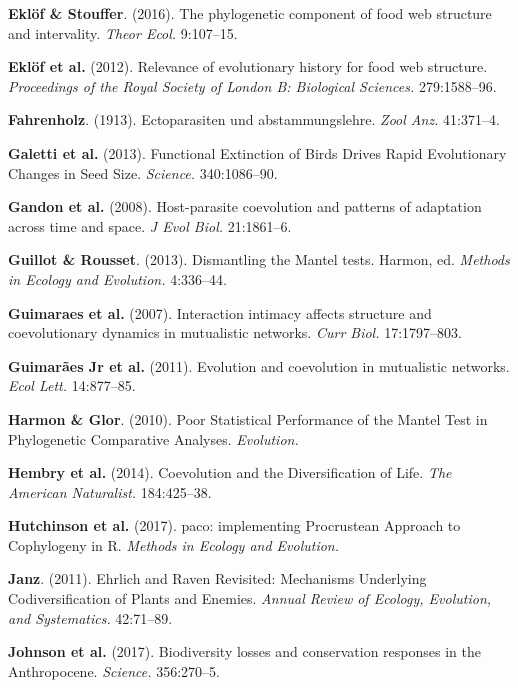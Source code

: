 \documentclass[11pt,serif]{article}
\begin{document}
\hypertarget{ref-eklo16pcf}{}
\textbf{Eklöf \& Stouffer}. (2016). The phylogenetic component of food
web structure and intervality. \emph{Theor Ecol.} 9:107--15.

\hypertarget{ref-eklo12reh}{}
\textbf{Eklöf et al.} (2012). Relevance of evolutionary history for food
web structure. \emph{Proceedings of the Royal Society of London B:
Biological Sciences.} 279:1588--96.

\hypertarget{ref-fahr13eua}{}
\textbf{Fahrenholz}. (1913). Ectoparasiten und abstammungslehre.
\emph{Zool Anz.} 41:371--4.

\hypertarget{ref-gale13feb}{}
\textbf{Galetti et al.} (2013). Functional Extinction of Birds Drives
Rapid Evolutionary Changes in Seed Size. \emph{Science.} 340:1086--90.

\hypertarget{ref-gand08hcp}{}
\textbf{Gandon et al.} (2008). Host-parasite coevolution and patterns of
adaptation across time and space. \emph{J Evol Biol.} 21:1861--6.

\hypertarget{ref-guil13dmt}{}
\textbf{Guillot \& Rousset}. (2013). Dismantling the Mantel tests.
Harmon, ed. \emph{Methods in Ecology and Evolution.} 4:336--44.

\hypertarget{ref-guim07iia}{}
\textbf{Guimaraes et al.} (2007). Interaction intimacy affects structure
and coevolutionary dynamics in mutualistic networks. \emph{Curr Biol.}
17:1797--803.

\hypertarget{ref-guim11ecm}{}
\textbf{Guimarães Jr et al.} (2011). Evolution and coevolution in
mutualistic networks. \emph{Ecol Lett.} 14:877--85.

\hypertarget{ref-harm10psp}{}
\textbf{Harmon \& Glor}. (2010). Poor Statistical Performance of the
Mantel Test in Phylogenetic Comparative Analyses. \emph{Evolution.}

\hypertarget{ref-hemb14cdl}{}
\textbf{Hembry et al.} (2014). Coevolution and the Diversification of
Life. \emph{The American Naturalist.} 184:425--38.

\hypertarget{ref-hutc17pip}{}
\textbf{Hutchinson et al.} (2017). paco: implementing Procrustean
Approach to Cophylogeny in R. \emph{Methods in Ecology and Evolution.}

\hypertarget{ref-janz11err}{}
\textbf{Janz}. (2011). Ehrlich and Raven Revisited: Mechanisms
Underlying Codiversification of Plants and Enemies. \emph{Annual Review
of Ecology, Evolution, and Systematics.} 42:71--89.

\hypertarget{ref-john17blc}{}
\textbf{Johnson et al.} (2017). Biodiversity losses and conservation
responses in the Anthropocene. \emph{Science.} 356:270--5.
\end{document}
